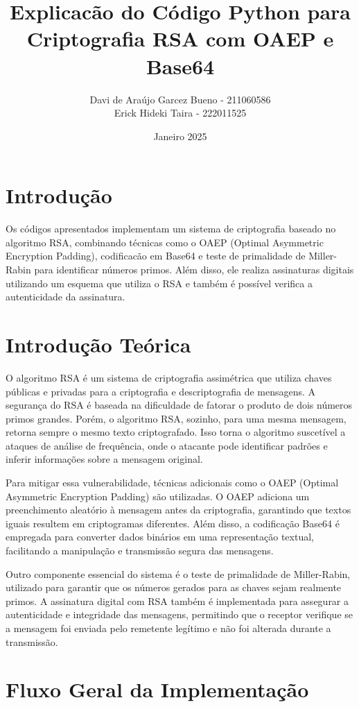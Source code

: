 \documentclass{article}
\title{Explicacão do Código Python para Criptografia RSA com OAEP e Base64}
\author{Davi de Araújo Garcez Bueno - 211060586 \\ Erick Hideki Taira - 222011525}
\date{Janeiro 2025}
\begin{document}
\maketitle

\section{Introdução}
Os códigos apresentados implementam um sistema de criptografia baseado no algoritmo RSA, combinando técnicas como o OAEP (Optimal Asymmetric Encryption Padding), 
 codificacão em Base64 e teste de primalidade de Miller-Rabin para identificar números primos. Além disso, ele realiza assinaturas digitais utilizando um esquema que
 utiliza o RSA e também é possível verifica a autenticidade da assinatura.

\section{Introdução Teórica}

O algoritmo RSA é um sistema de criptografia assimétrica que utiliza chaves públicas e privadas para a criptografia e descriptografia de mensagens.
A segurança do RSA é baseada na dificuldade de fatorar o produto de dois números primos grandes. Porém, o algoritmo RSA, sozinho, para uma mesma mensagem,
retorna sempre o mesmo texto criptografado. Isso torna o algoritmo suscetível a ataques de análise de frequência,
onde o atacante pode identificar padrões e inferir informações sobre a mensagem original.

Para mitigar essa vulnerabilidade, técnicas adicionais como o OAEP (Optimal Asymmetric Encryption Padding) são utilizadas.
O OAEP adiciona um preenchimento aleatório à mensagem antes da criptografia,
garantindo que textos iguais resultem em criptogramas diferentes.
Além disso, a codificação Base64 é empregada para converter dados binários em uma representação textual,
facilitando a manipulação e transmissão segura das mensagens.

Outro componente essencial do sistema é o teste de primalidade de Miller-Rabin, utilizado para garantir
 que os números gerados para as chaves sejam realmente primos. A assinatura digital com RSA também é
  implementada para assegurar a autenticidade e integridade das mensagens, permitindo que o receptor
   verifique se a mensagem foi enviada pelo remetente legítimo e não foi alterada durante a transmissão.

\section{Fluxo Geral da Implementação}
\end{document}
